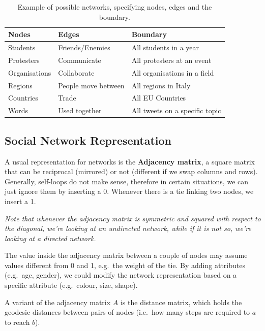 \documentclass[
  notitlepage,
  onecolumn,
  openany]{book}
\begin{document}
\begin{table}[h!]
\centering
\begin{tabular}{@{}lll@{}}
\toprule
\textbf{Nodes} & \textbf{Edges}      & \textbf{Boundary}              \\ \midrule
Students       & Friends/Enemies     & All students in a year         \\
Protesters     & Communicate         & All protesters at an event     \\
Organisations  & Collaborate         & All organisations in a field   \\
Regions        & People move between & All regions in Italy           \\
Countries      & Trade               & All EU Countries               \\
Words          & Used together       & All tweets on a specific topic \\ \bottomrule
\end{tabular}
\caption{Example of possible networks, specifying nodes, edges and the boundary. }
\label{tab:network_example}
\end{table}

\hypertarget{social-network-representation}{%
\subsection{Social Network Representation}\label{social-network-representation}}

A usual representation for networks is the \textbf{Adjacency matrix}, a square matrix that can be reciprocal (mirrored) or not (different if we swap columns and rows). Generally, self-loops do not make sense, therefore in certain situations, we can just ignore them by inserting a 0. Whenever there is a tie linking two nodes, we insert a 1.

\emph{Note that whenever the adjacency matrix is symmetric and squared with respect to the diagonal, we're looking at an undirected network, while if it is not so, we're looking at a directed network.}

The value inside the adjacency matrix between a couple of nodes may assume values different from 0 and 1, e.g.~the weight of the tie. By adding attributes (e.g.~age, gender), we could modify the network representation based on a specific attribute (e.g.~colour, size, shape).

A variant of the adjacency matrix \(A\) is the distance matrix, which holds the geodesic distances between pairs of nodes (i.e.~how many steps are required to \(a\) to reach \(b\)).
\end{document}
